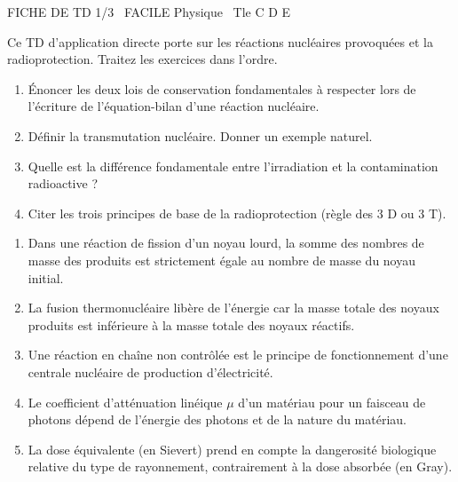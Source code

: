 \documentclass[11pt]{article}
\begin{document}
\begin{tcolorbox}[enhanced,colback=popink,colframe=popink,arc=10pt,boxrule=0pt,left=12pt,right=12pt,top=9pt,bottom=9pt]
{\color{white}\popxbold\small FICHE DE TD 1/3 \textbullet\ FACILE \hfill Physique \textbullet\ Tle C D E\par}
\end{tcolorbox}
\vspace{4pt}
Ce TD d'application directe porte sur les réactions nucléaires provoquées et la radioprotection. Traitez les exercices dans l'ordre.

\begin{exercice}
\begin{enumerate}
    \item Énoncer les deux lois de conservation fondamentales à respecter lors de l'écriture de l'équation-bilan d'une réaction nucléaire.
    \item Définir la transmutation nucléaire. Donner un exemple naturel.
    \item Quelle est la différence fondamentale entre l'irradiation et la contamination radioactive ?
    \item Citer les trois principes de base de la radioprotection (règle des 3 D ou 3 T).
\end{enumerate}
\end{exercice}

\begin{exercice}
\begin{enumerate}
    \item Dans une réaction de fission d'un noyau lourd, la somme des nombres de masse des produits est strictement égale au nombre de masse du noyau initial.
    \item La fusion thermonucléaire libère de l'énergie car la masse totale des noyaux produits est inférieure à la masse totale des noyaux réactifs.
    \item Une réaction en chaîne non contrôlée est le principe de fonctionnement d'une centrale nucléaire de production d'électricité.
    \item Le coefficient d'atténuation linéique $\mu$ d'un matériau pour un faisceau de photons dépend de l'énergie des photons et de la nature du matériau.
    \item La dose équivalente (en Sievert) prend en compte la dangerosité biologique relative du type de rayonnement, contrairement à la dose absorbée (en Gray).
\end{enumerate}
\end{exercice}
\end{document}
